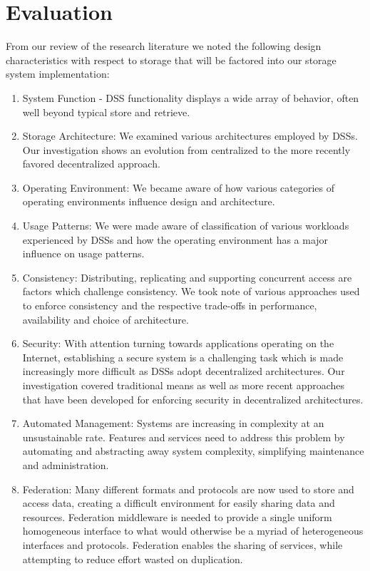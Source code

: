 \documentclass[11pt]{article}
\begin{document}
\section{Evaluation}
From our review of the research literature we noted the following 
design characteristics with respect to storage that will be factored 
into our storage system implementation:

\begin{enumerate}
\item  System Function - DSS functionality displays a wide array 
of behavior, often well beyond typical store and retrieve.
\item Storage Architecture: We examined various architectures
employed by DSSs. Our investigation shows an evolution from 
centralized to the more recently favored decentralized approach.
\item Operating Environment: We became aware of how various
categories of operating environments influence design and
architecture.
\item Usage Patterns: We were made aware of classification of
various workloads experienced by DSSs and how the operating 
environment has a major influence on usage patterns.
\item  Consistency: Distributing, replicating and supporting
concurrent access are factors which challenge consistency. We
took note of various approaches used to enforce consistency
and the respective trade-offs in performance, availability and
choice of architecture.
\item Security: With attention turning towards applications
operating on the Internet, establishing a secure system is a
challenging task which is made increasingly more difficult as
DSSs adopt decentralized architectures. Our investigation
covered traditional means as well as more recent approaches
that have been developed for enforcing security in
decentralized architectures.
\item Automated Management: Systems are increasing in
complexity at an unsustainable rate. Features and services
need to address this problem by automating and abstracting
away system complexity, simplifying maintenance and
administration.
\item Federation: Many different formats and protocols are now
used to store and access data, creating a difficult environment
for easily sharing data and resources. Federation middleware is
needed to provide a single uniform homogeneous interface to
what would otherwise be a myriad of heterogeneous interfaces
and protocols. Federation enables the sharing of services,
while attempting to reduce effort wasted on duplication.
\end{enumerate}
\end{document}
